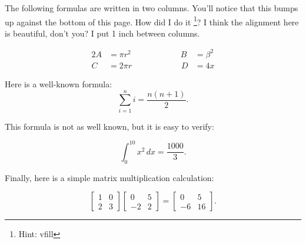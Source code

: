 \documentclass[10pt]{article}
\begin{document}
\vfill
The following formulas are written in two columns. You'll notice that this bumps up against the bottom of this page. How did I do it \footnote{Hint: vfill}? I think the alignment here is beautiful, don't you? I put 1 inch between columns.

\begin{alignat}{2}
A &= \pi r^2 \hspace{1in} B &= \beta^2 \\
C &= 2\pi r \hspace{1in} D &= 4x
\end{alignat}

\newpage
Here is a well-known formula:
$$\sum_{i=1}^{n} i = \frac{n(n + 1)}{2}.$$

This formula is not as well known, but it is easy to verify:

$$\int_{0}^{10} x^2\, dx = \frac{1000}{3}.$$

Finally, here is a simple matrix multiplication calculation:

$$
\begin{bmatrix} 
 1 &  0 \\
 2 &  3
\end{bmatrix}
\begin{bmatrix} 
  0 & 5 \\
 -2 & 2
\end{bmatrix}
=
\begin{bmatrix} 
  0 & 5 \\
 -6 & 16
\end{bmatrix}
.
$$
\end{document}
